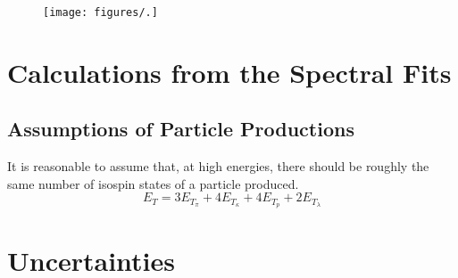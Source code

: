 	\begin{figure}[h]
	  \centering
	  \texttt{[image: figures/.]}
	  \caption{ \cite{}}\label{fig:}
	\end{figure}

\section{Calculations from the Spectral Fits}
\subsection{Assumptions of Particle Productions}
It is reasonable to assume that, at high energies, there should be roughly the same number of isospin states of a particle produced. 
	\begin{equation}\label{eqn:TotET}
	E_{T} = 3E_{T}_\pi + 4E_{T}_\kappa + 4E_{T}_p + 2E_{T}_\lambda
	\end{equation}
 
\subsection{}
\subsection{}
\section{Uncertainties}
